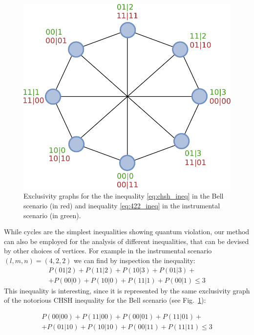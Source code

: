 \documentclass[letterpaper]{article}
\begin{document}
\begin{figure}[t]
    \centering
        \includegraphics[width=\columnwidth]{images/gclmp_graphs.pdf}
        \caption{Exclusivity graphs for the the inequality \eqref{eq:chsh_ineq} in the Bell
        scenario (in red) and inequality \eqref{eq:422_ineq} in the instrumental
    scenario (in green).}
        \label{fig:422_exgraph}
\end{figure}

While cycles are the simplest inequalities showing quantum violation, our method
can also be employed for the analysis of different inequalities, that can be 
devised by other choices of vertices. 
For example in the instrumental scenario $(l,m,n) = (4,2,2)$ we can find by inspection the inequality: 
\begin{multline}
    P(01\vert2) + P(11\vert2) + P(10\vert3) + P(01\vert3) + \\
     + P(00\vert0) + P(10\vert0) + P(11\vert1) + P(00\vert1) \le 3
    \label{eq:422_ineq}
\end{multline}
This inequality is interesting, since it is represented by the same
exclusivity graph of the notorious CHSH inequality \cite{CHSH} for the
Bell scenario (see Fig.~\ref{fig:422_exgraph}):

\begin{multline}
 P(00\vert 00) + P(11 \vert 00) + P(00\vert 01) + P(11 \vert 01) + \\
 +P(01 \vert 10) + P(10 \vert 10) + P(00 \vert 11) + P(11 \vert 11) \leq 3
\label{eq:chsh_ineq}
\end{multline}
\end{document}
